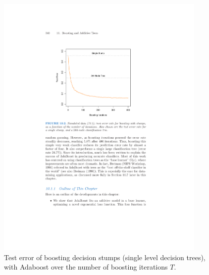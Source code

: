 \begin{figure}[H]
  \centering
  \includegraphics[width=4in]{adaboost_stumps.pdf}
  \caption{Test error of boosting decision stumps (single level decision
  trees), with Adaboost over the number of boosting iterations $T$.}
\end{figure}



%
%
%
%
%
%
%
%
%



